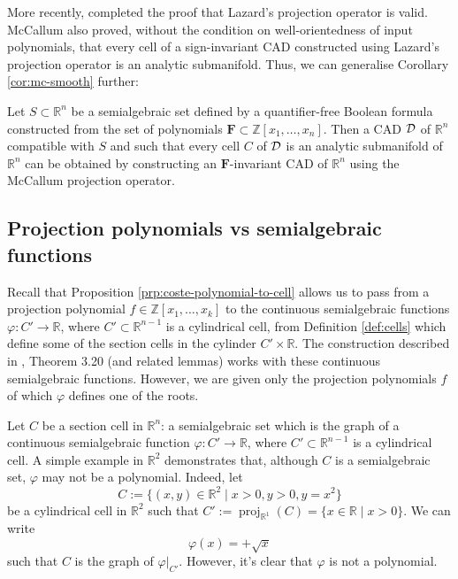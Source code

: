 \documentclass[
]{book}
\theoremstyle{definition}
\theoremstyle{definition}
\theoremstyle{definition}
\theoremstyle{definition}
\theoremstyle{remark}
\begin{document}
More recently, \citet{mccallum2019} completed the proof that Lazard's projection operator is valid. McCallum also proved,
without the condition on well-orientedness of input polynomials, that every cell of a sign-invariant CAD constructed
using Lazard's projection operator is an analytic submanifold. Thus, we can generalise Corollary \ref{cor:mc-smooth} further:

\leavevmode\hypertarget{lz-smooth}{}%
Let \(S \subset \mathbb{R}^n\) be a semialgebraic set defined by a quantifier-free Boolean formula constructed from the set of polynomials \(\mathbf{F} \subset \mathbb{Z}[x_1,\ldots,x_n]\).
Then a CAD \(\cal D\) of \(\mathbb{R}^n\) compatible with \(S\) and such that every cell \(C\) of \(\cal D\) is an analytic submanifold of \(\mathbb{R}^n\) can be obtained by constructing an \(\mathbf{F}\)-invariant CAD of \(\mathbb{R}^n\) using the McCallum projection operator.

\hypertarget{projection-polynomials-vs-semialgebraic-functions}{%
\subsection{Projection polynomials vs semialgebraic functions}\label{projection-polynomials-vs-semialgebraic-functions}}

Recall that Proposition \ref{prp:coste-polynomial-to-cell} allows us to pass from a projection polynomial \(f \in \mathbb{Z}[x_1,\ldots,x_k]\) to the continuous semialgebraic functions \(\varphi : C' \to \mathbb{R}\), where \(C' \subset \mathbb{R}^{n-1}\) is a cylindrical cell, from Definition \ref{def:cells} which define some of the section cells in the cylinder \(C' \times \mathbb{R}\). The construction described in \citet{bgv15}, Theorem 3.20 (and related lemmas) works with these continuous semialgebraic functions. However, we are given only the projection polynomials \(f\) of which \(\varphi\) defines one of the roots.

Let \(C\) be a section cell in \(\mathbb{R}^n\): a semialgebraic set which is the graph of a continuous semialgebraic function \(\varphi : C' \to \mathbb{R}\), where \(C' \subset \mathbb{R}^{n-1}\) is a cylindrical cell. A simple example in \(\mathbb{R}^2\) demonstrates that, although \(C\) is a semialgebraic set, \(\varphi\) may not be a polynomial. Indeed, let
\[ C := \{ (x,y) \in \mathbb{R}^2 \mid x > 0, y > 0, y = x^2 \} \]
be a cylindrical cell in \(\mathbb{R}^2\) such that \(C' := {\operatorname{proj}_{\mathbb{R}^{1}}}(C) = \{ x \in \mathbb{R}\mid x > 0 \}\). We can write
\[
\varphi(x) = +\sqrt{x}
\]
such that \(C\) is the graph of \(\varphi\vert_{C'}\). However, it's clear that \(\varphi\) is not a polynomial.
\end{document}
